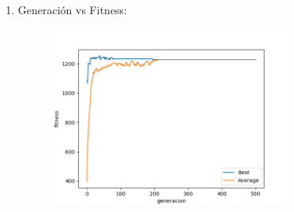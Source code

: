 \documentclass[11pt,letterpaper]{article}
\begin{document}
\begin{enumerate}[label=\alph*)]
        \begin{enumerate}[label=\arabic*.]
            \item Generación vs Fitness:
            \begin{figure}[H]
                \centering
                \includegraphics[width=8cm]{images/gen-vs-fitness.png}
                \label{fig:gen-vs-fit}
            \end{figure}


\end{enumerate}
\end{enumerate}
\end{document}
